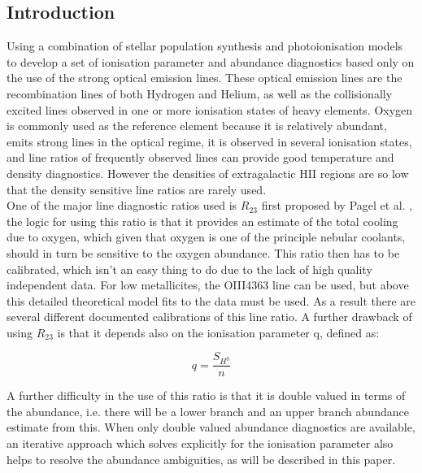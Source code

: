 \documentclass{literature}
\begin{document}
\subsection{Introduction}
Using a combination of stellar population synthesis and photoionisation models to develop a set of ionisation parameter and abundance diagnostics based only on the use of the strong optical emission lines. These optical emission lines are the recombination lines of both Hydrogen and Helium, as well as the collisionally excited lines observed in one or more ionisation states of heavy elements. Oxygen is commonly used as the reference element because it is relatively abundant, emits strong lines in the optical regime, it is observed in several ionisation states, and line ratios of frequently observed lines can provide good temperature and density diagnostics. However the densities of extragalactic HII regions are so low that the density sensitive line ratios are rarely used.  \\ 
One of the major line diagnostic ratios used is $R_{23}$ first proposed by Pagel et al. \citep{Pagel_1979}, the logic for using this ratio is that it provides an estimate of the total cooling due to oxygen, which given that oxygen is one of the principle nebular coolants, should in turn be sensitive to the oxygen abundance. This ratio then has to be calibrated, which isn't an easy thing to do due to the lack of high quality independent data. For low metallicites, the OIII4363 line can be used, but above this detailed theoretical model fits to the data must be used. As a result there are several different documented calibrations of this line ratio. A further drawback of using $R_{23}$ is that it depends also on the ionisation parameter q, defined as: 

\begin{equation}
	q = \frac{S_{H^{0}}}{n}
\end{equation}

A further difficulty in the use of this ratio is that it is double valued in terms of the abundance, i.e. there will be a lower branch and an upper branch abundance estimate from this. When only double valued abundance diagnostics are available, an iterative approach which solves explicitly for the ionisation parameter also helps to resolve the abundance ambiguities, as will be described in this paper. \\
\end{document}

